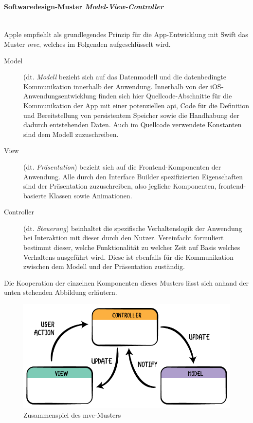 \paragraph{Softwaredesign-Muster \textit{Model-View-Controller}}\mbox{}\\ 
Apple empfiehlt als grundlegendes Prinzip für die App-Entwicklung mit Swift das Muster \textit{\ac{mvc}}, welches im Folgenden aufgeschlüsselt wird.

\begin{description}
	\item[Model] (dt. \textit{Modell} bezieht sich auf das Datenmodell und die datenbedingte Kommunikation innerhalb der Anwendung. Innerhalb von der iOS-Anwendungsentwicklung finden sich hier Quellcode-Abschnitte für die Kommunikation der App mit einer potenziellen \acs{api}, Code für die Definition und Bereitstellung von persistentem Speicher sowie die Handhabung der dadurch entstehenden Daten. Auch im Quellcode verwendete Konstanten sind dem Modell zuzuschreiben.
	\item[View] (dt. \textit{Präsentation}) bezieht sich auf die Frontend-Komponenten der Anwendung. Alle durch den Interface Builder spezifizierten Eigenschaften sind der Präsentation zuzuschreiben, also jegliche Komponenten, frontend-basierte Klassen sowie Animationen.
	\item[Controller] (dt. \textit{Steuerung}) beinhaltet die spezifische Verhaltenslogik der Anwendung bei Interaktion mit dieser durch den Nutzer. Vereinfacht formuliert bestimmt dieser, welche Funktionalität zu welcher Zeit auf Basis welches Verhaltens ausgeführt wird. Diese ist ebenfalls für die Kommunikation zwischen dem Modell und der Präsentation zuständig.
\end{description}

Die Kooperation der einzelnen Komponenten dieses Musters lässt sich anhand der unten stehenden Abbildung erläutern.

\begin{figure}[h!]
	\centering
	\includegraphics[width=0.5\linewidth]{img/mvc}
	\caption{Zusammenspiel des \ac{mvc}-Musters}
\end{figure}

